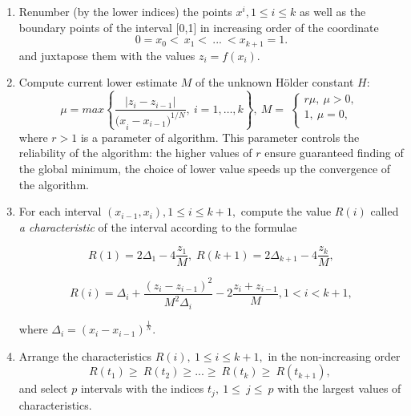 \documentclass{cmi}
\begin{document}
\begin{enumerate}
	
	\item  Renumber (by the lower indices) the points $x^i, 1\leq i\leq k$ as well as the boundary points of  the interval [0,1] in increasing order of the coordinate  
	\begin{equation} 
		\label{agp1_sort} 	0=x_0<\ x_1<\ ...\ <x_{k+1}=1. 	
	\end{equation} 
	and juxtapose them with the values $z_i=f(x_i)$. 
	
	\item  Compute current lower estimate $M$ of the unknown H{\"o}lder constant $H$:  
	\begin{equation} 
		\label{agp2_mu} 	\mu=max\left\{\frac{|z_i-z_{i-1}|}{{{(x}_i-x_{i-1})}^{1/N}},\ i=1,\ldots,k\right\},\ M=\  \left\{\begin{matrix}r\mu,\ \mu>0,\\1,\ \mu=0,\\\end{matrix}\right.\ 	
	\end{equation} 
	where $r>1$ is a parameter of algorithm. This parameter controls the reliability of the algorithm: the  higher values of $r$ ensure guaranteed finding of the global minimum, the choice of lower value speeds up the convergence of the algorithm. 
	
	\item  For each interval $(x_{i-1},x_i), 1\leq i\leq k+1,$ compute the value $R(i)$ called \textit{a  characteristic} of the interval according to the formulae 
	
	\begin{equation} 
		\label{agp3_R1} R(1)=2\Delta_1-4\dfrac{z_1}{M}, \; R(k+1)=2\Delta_{k+1}-4\dfrac{z_k}{M}, 
	\end{equation} 
	
	\begin{equation} 
		\label{agp3_Ri} R(i)=\Delta_i+\dfrac{(z_i-z_{i-1})^2}{M^2\Delta_i}-2\dfrac{z_i+z_{i-1}}{M},1<i<k+1, 
	\end{equation} 
	
	where \(\Delta_i=(x_i-x_{i-1})^\frac{1}{N}\).
	
	\item   Arrange the characteristics $R\left(i\right),\ 1\leq i \leq k+1,$ in the non-increasing order 
	\begin{equation} 
		\label{agp4_R_sort} 	R\left(t_1\right)\geq\ R\left(t_2\right)\geq...\geq\ R\left(t_k\right)\geq\ R(t_{k+1}),\  
	\end{equation} 	
	and select $p$ intervals with the indices $t_j,\ 1\le\ j\le\ p$ with the largest values of characteristics.
	

\end{enumerate}
\end{document}
